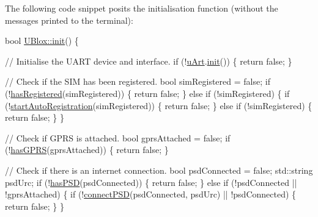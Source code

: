 The following code snippet posits the initialisation function (without the messages printed to the terminal)\+: 
\begin{DoxyCode}
\textcolor{keywordtype}{bool} \hyperlink{class_u_blox_a34c2f507ff3bbd21b9aea788a015527a}{UBlox::init}()
\{

    \textcolor{comment}{// Initialise the UART device and interface.}
    \textcolor{keywordflow}{if} (!\hyperlink{class_u_blox_a034c0463d1c199d094d657c8ebb151e8}{uArt}.\hyperlink{class_u_art_a51adaa81c08d92599768c0303e5abc94}{init}()) \{
        \textcolor{keywordflow}{return} \textcolor{keyword}{false};
    \}

    \textcolor{comment}{// Check if the SIM has been registered.}
    \textcolor{keywordtype}{bool} simRegistered = \textcolor{keyword}{false};
    \textcolor{keywordflow}{if} (!\hyperlink{class_u_blox_a1889c2b9bb6087bc939bd2a27b68623b}{hasRegistered}(simRegistered)) \{
        \textcolor{keywordflow}{return} \textcolor{keyword}{false};
    \} \textcolor{keywordflow}{else} \textcolor{keywordflow}{if} (!simRegistered) \{
        \textcolor{keywordflow}{if} (!\hyperlink{class_u_blox_a2e816e864ebf43743b3f6187e20c2b1f}{startAutoRegistration}(simRegistered)) \{
            \textcolor{keywordflow}{return} \textcolor{keyword}{false};
        \} \textcolor{keywordflow}{else} \textcolor{keywordflow}{if} (!simRegistered) \{
            \textcolor{keywordflow}{return} \textcolor{keyword}{false};
        \}
    \}

    \textcolor{comment}{// Check if GPRS is attached.}
    \textcolor{keywordtype}{bool} gprsAttached = \textcolor{keyword}{false};
    \textcolor{keywordflow}{if} (!\hyperlink{class_u_blox_a4f5a31b4ddda664b255ce3f63e9ffac7}{hasGPRS}(gprsAttached)) \{
        \textcolor{keywordflow}{return} \textcolor{keyword}{false};
    \}

    \textcolor{comment}{// Check if there is an internet connection.}
    \textcolor{keywordtype}{bool} psdConnected = \textcolor{keyword}{false};
    std::string psdUrc;
    \textcolor{keywordflow}{if} (!\hyperlink{class_u_blox_ae49b51a602a327b5eff5b04d2ccaec20}{hasPSD}(psdConnected)) \{
        \textcolor{keywordflow}{return} \textcolor{keyword}{false};
    \} \textcolor{keywordflow}{else} \textcolor{keywordflow}{if} (!psdConnected || !gprsAttached) \{
        \textcolor{keywordflow}{if} (!\hyperlink{class_u_blox_ac250bd4aea14e09b3a2595c2b8eda18a}{connectPSD}(psdConnected, psdUrc) || !psdConnected) \{
            \textcolor{keywordflow}{return} \textcolor{keyword}{false};
        \}
    \}


\end{DoxyCode}
